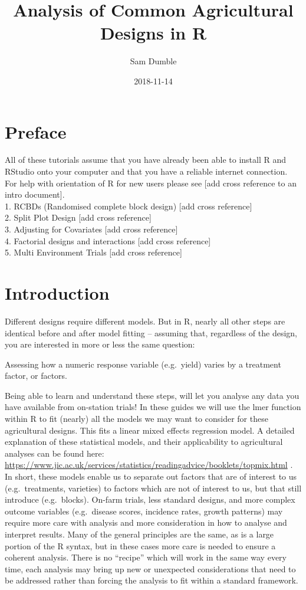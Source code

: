 \documentclass[]{book}
\title{Analysis of Common Agricultural Designs in R}
\author{Sam Dumble}
\date{2018-11-14}
\theoremstyle{definition}
\theoremstyle{definition}
\theoremstyle{definition}
\theoremstyle{remark}
\begin{document}
\maketitle

{
\setcounter{tocdepth}{1}
\tableofcontents
}
\chapter{Preface}\label{preface}

All of these tutorials assume that you have already been able to install
R and RStudio onto your computer and that you have a reliable internet
connection. For help with orientation of R for new users please see
{[}add cross reference to an intro document{]}.\\
1. RCBDs (Randomised complete block design) {[}add cross reference{]}\\
2. Split Plot Design {[}add cross reference{]}\\
3. Adjusting for Covariates {[}add cross reference{]}\\
4. Factorial designs and interactions {[}add cross reference{]}\\
5. Multi Environment Trials {[}add cross reference{]}

\chapter{Introduction}\label{intro}

Different designs require different models. But in R, nearly all other
steps are identical before and after model fitting -- assuming that,
regardless of the design, you are interested in more or less the same
question:

Assessing how a numeric response variable (e.g.~yield) varies by a
treatment factor, or factors.

Being able to learn and understand these steps, will let you analyse any
data you have available from on-station trials! In these guides we will
use the lmer function within R to fit (nearly) all the models we may
want to consider for these agricultural designs. This fits a linear
mixed effects regression model. A detailed explanation of these
statistical models, and their applicability to agricultural analyses can
be found here:
\url{https://www.jic.ac.uk/services/statistics/readingadvice/booklets/topmix.html}
. In short, these models enable us to separate out factors that are of
interest to us (e.g.~treatments, varieties) to factors which are not of
interest to us, but that still introduce (e.g.~blocks). On-farm trials,
less standard designs, and more complex outcome variables (e.g.~disease
scores, incidence rates, growth patterns) may require more care with
analysis and more consideration in how to analyse and interpret results.
Many of the general principles are the same, as is a large portion of
the R syntax, but in these cases more care is needed to ensure a
coherent analysis. There is no ``recipe'' which will work in the same
way every time, each analysis may bring up new or unexpected
considerations that need to be addressed rather than forcing the
analysis to fit within a standard framework.
\end{document}
